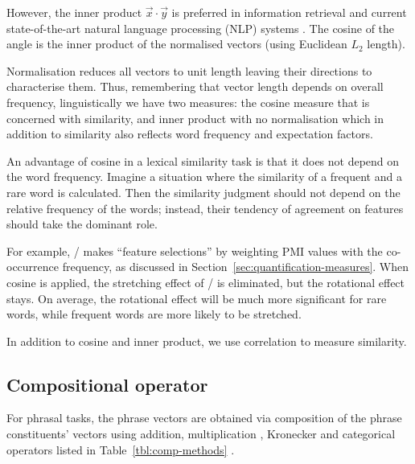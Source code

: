 However, the inner product $\vec{x} \cdot \vec{y}$ is preferred in information retrieval and current state-of-the-art natural language processing (NLP) systems \cite{mikolov2013distributed,mikolov2013linguistic,TACL570}. The cosine of the angle is the inner product of the normalised vectors (using Euclidean $L_2$ length).
%
%

Normalisation reduces all vectors to unit length leaving their directions to characterise them. Thus, remembering that vector length depends on overall frequency, linguistically we have two measures: the cosine measure that is concerned with similarity, and inner product with no normalisation which in addition to similarity also reflects word frequency and expectation factors.
%
%

An advantage of cosine in a lexical similarity task is that it does not depend on the word frequency. Imagine a situation where the similarity of a frequent and a rare word is calculated. Then the similarity judgment should not depend on the relative frequency of the words; instead, their tendency of agreement on features should take the dominant role.

For example, \NPMI/ makes ``feature selections'' by weighting PMI values with the co-occurrence frequency, as discussed in Section~\ref{sec:quantification-measures}. When cosine is applied, the stretching effect of \NPMI/ is eliminated, but the rotational effect stays. On average, the rotational effect will be much more significant for rare words, while frequent words are more likely to be stretched.

In addition to cosine and inner product, we use correlation \cite{kiela-clark:2014:CVSC} to measure similarity.

\subsection{Compositional operator}
\label{sec:comp-oper}



For phrasal tasks, the phrase vectors are obtained via composition of the phrase constituents' vectors using addition, multiplication \cite{mitchell2010composition,mitchell-lapata:2008:ACLMain}, Kronecker \cite{Grefenstette:2011:ESC:2145432.2145580} and categorical operators listed in Table~\ref{tbl:comp-methods} \cite{milajevs-EtAl:2014:EMNLP2014,DBLP:journals/corr/abs-1003-4394}.

